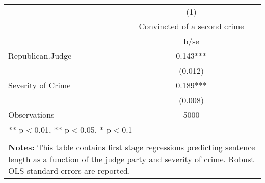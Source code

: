\begin{tabular}{l*{1}{c}}
\hline\hline
                    &\multicolumn{1}{c}{(1)}\\
                    &\multicolumn{1}{c}{Convincted of a second crime}\\
                    &        b/se         \\
\hline
Republican.Judge    &       0.143***\\
                    &     (0.012)         \\
Severity of Crime   &       0.189***\\
                    &     (0.008)         \\
Observations        &        5000         \\
\multicolumn{2}{p{0.6\linewidth}}{\small *** p$<$0.01, ** p$<$0.05, * p$<$0.1} \\
\\
\multicolumn{2}{p{0.6\linewidth}}{\small \textbf{Notes:} This table contains first stage regressions predicting sentence length as a function of the judge party and severity of crime. Robust OLS standard errors are reported.} \\
\end{tabular}

